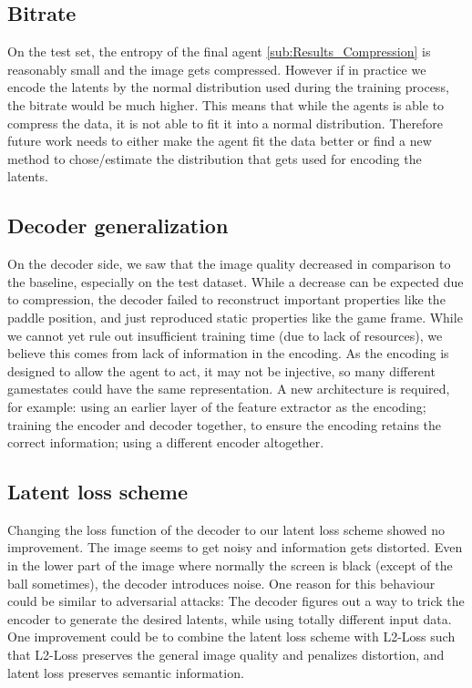 \subsection{Bitrate}
On the test set, the entropy of the final agent \ref{sub:Results_Compression} is
reasonably small and the image gets compressed. However if in practice we encode
the latents by the normal distribution used during the training process, the
bitrate would be much higher. This means that while the agents is able to
compress the data, it is not able to fit it into a normal distribution.
Therefore future work needs to either make the agent fit the data better or find
a new method to chose/estimate the distribution that gets used for encoding the
latents.

\subsection{Decoder generalization}
On the decoder side, we saw that the image quality decreased in
comparison to the baseline, especially on the test dataset. While a decrease can
be expected due to compression, the decoder failed to reconstruct important
properties like the paddle position, and just reproduced static properties like
the game frame. While we cannot yet rule out insufficient training time (due to
lack of resources), we believe this comes from lack of information in the
encoding. As the encoding is designed to allow the agent to act, it may not be
injective, so many different gamestates could have the same representation. A
new architecture is required, for example: using an earlier layer of the feature
extractor as the encoding; training the encoder and decoder together, to ensure
the encoding retains the correct information; using a different encoder
altogether.

\subsection{Latent loss scheme}
Changing the loss function of the decoder to our latent loss scheme showed no
improvement. The image seems to get noisy and information gets distorted. Even
in the lower part of the image where normally the screen is black (except of the
ball sometimes), the decoder introduces noise. One reason for this behaviour
could be similar to adversarial attacks: The decoder figures out a way to trick
the encoder to generate the desired latents, while using totally different input
data. One improvement could be to combine the latent loss scheme with L2-Loss
such that L2-Loss preserves the general image quality and penalizes distortion,
and latent loss preserves semantic information.

